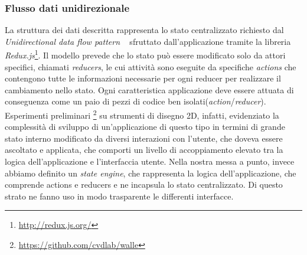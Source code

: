 \subsubsection*{Flusso dati unidirezionale}
\noindent
La struttura dei dati descritta rappresenta lo stato centralizzato richiesto dal \emph{Unidirectional data flow pattern}
~\cite{uniflow} sfruttato dall'applicazione tramite la libreria \emph{Redux.js}\footnote{\url{http://redux.js.org/}}.
Il modello prevede che lo stato può essere modificato solo da attori specifici, chiamati \emph{reducers},
le cui attività sono eseguite da specifiche \emph{actions} che contengono tutte le informazioni necessarie per
ogni reducer per realizzare il cambiamento nello stato. Ogni caratteristica applicazione deve essere attuata di conseguenza
come un paio di pezzi di codice ben isolati(\emph{action}/\emph{reducer}). Esperimenti preliminari
\footnote{\url{https://github.com/cvdlab/walle}} su strumenti di disegno 2D, infatti,
evidenziato la complessità di sviluppo di un'applicazione di questo tipo in termini di grande stato interno modificato
da diversi interazioni con l'utente, che doveva essere ascoltato e applicata,
che comporti un livello di accoppiamento elevato tra la logica dell'applicazione e l'interfaccia utente.
Nella nostra messa a punto, invece abbiamo definito un \emph{state engine}, che rappresenta la logica dell'applicazione,
che comprende actions e reducers e ne incapsula lo stato centralizzato.
Di questo strato ne fanno uso in modo trasparente le differenti interfacce.


